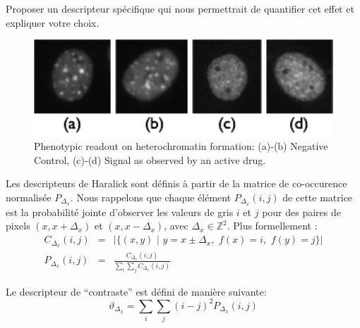\documentclass[11pt,addpoints]{exam}
\begin{document}
\begin{questions}
Proposer un descripteur spécifique qui nous permettrait de quantifier
cet effet et expliquer votre choix. 

\begin{figure}[!ht]
\centering
\includegraphics[scale=0.8]{TSA_phenotype.pdf}
\caption{Phenotypic readout on heterochromatin formation: (a)-(b)
  Negative Control, (c)-(d) Signal as observed 
  by an active drug.}
\label{fig:tsa}
\end{figure}

Les descripteurs de Haralick sont définis à partir de la matrice de
co-occurence normalisée $P_{\Delta_x}$. Nous rappelons que chaque élément
$P_{\Delta_x}(i,j)$ de cette matrice est la probabilité jointe
d'observer les valeurs de gris $i$ et $j$ pour des paires de pixels
$(x,x+\Delta_x)$ et $(x,x-\Delta_x)$, avec $\Delta_x \in
\mathbb{Z}^2$. Plus formellement :  
\begin{eqnarray*}
C_{\Delta_x}(i,j) &=& |\{(x,y) \,\,| \,\, y=x \pm \Delta_x, \,\, f(x)=i,
\,\, f(y)=j \}| \\
P_{\Delta_x}(i,j) &=& \frac{C_{\Delta_x}(i,j)}{\sum_i\sum_j C_{\Delta_x}(i,j)}
\end{eqnarray*} 


Le descripteur de ``contraste'' est défini de manière suivante: 
\begin{equation}\label{equ:haralick_contrast}
\vartheta_{\Delta_x} = \sum_i\sum_j(i-j)^2P_{\Delta_x}(i,j)
\end{equation}

\end{questions}
\end{document}
